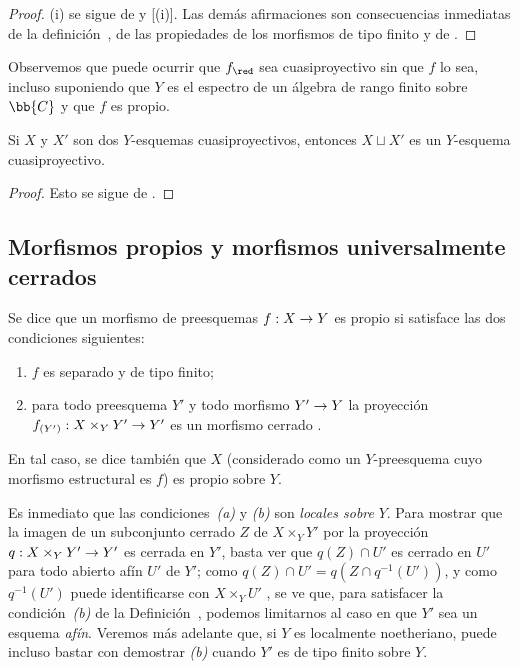 \documentclass[oneside,10pt]{amsart}
\makeatletter
\newcommand{\ega@arrow}[2]{\mathchoice{#1}{#2}{#2}{#2}}
\renewcommand{\to}{\ega@arrow{\longrightarrow}{\rightarrow}}
\let\EGAOriginalLabel\label
\renewcommand{\label}[1]{\phantomsection\EGAOriginalLabel{#1}}
\makeatother
\begin{document}
\begin{proof}
(i) se sigue de  y [(i)].
Las demás afirmaciones son consecuencias inmediatas de la definición~, de las propiedades de los morfismos de tipo finito  y de .
\end{proof}

\begin{remark}[5.3.5]
\label{II.5.3.5}
Observemos que puede ocurrir que $f_\red$ sea cuasiproyectivo sin que $f$ lo sea, incluso suponiendo que $Y$ es el espectro de un álgebra de rango finito sobre $\bb{C}$ y que $f$ es propio.
\end{remark}

\begin{corollary}[5.3.6]
\label{II.5.3.6}
Si $X$ y $X'$ son dos $Y$-esquemas cuasiproyectivos, entonces $X\sqcup X'$ es un $Y$-esquema cuasiproyectivo.
\end{corollary}

\begin{proof}
Esto se sigue de .
\end{proof}

\subsection{Morfismos propios y morfismos universalmente cerrados}
\label{subsection:II.5.4}

\begin{definition}[5.4.1]
\label{II.5.4.1}
Se dice que un morfismo de preesquemas $f:X\to Y$ es propio si satisface las dos condiciones siguientes:
\begin{enumerate}
  \item[(a)] $f$ es separado y de tipo finito;
  \item[(b)] para todo preesquema $Y'$ y todo morfismo $Y'\to Y$ la proyección $f_{(Y')}:X\times_Y Y'\to Y'$ es un morfismo cerrado .
\end{enumerate}

En tal caso, se dice también que $X$ (considerado como un $Y$-preesquema cuyo morfismo estructural es $f$) es propio sobre $Y$.
\end{definition}

Es inmediato que las condiciones~\emph{(a)} y \emph{(b)} son \emph{locales sobre} $Y$.
Para mostrar que la imagen de un subconjunto cerrado $Z$ de $X\times_Y Y'$ por la proyección $q:X\times_Y Y'\to Y'$ es cerrada en $Y'$, basta ver que $q(Z)\cap U'$ es cerrado en $U'$ para todo abierto afín $U'$ de $Y'$;
como $q(Z)\cap U'=q(Z\cap q^{-1}(U'))$, y como $q^{-1}(U')$ puede identificarse con $X\times_Y U'$ , se ve que, para satisfacer la condición~\emph{(b)} de la Definición~, podemos limitarnos al caso en que $Y'$ sea un esquema \emph{afín}.
Veremos más adelante  que, si $Y$ es localmente noetheriano, puede incluso bastar con demostrar \emph{(b)} cuando $Y'$ es de tipo finito sobre $Y$.
\end{document}
